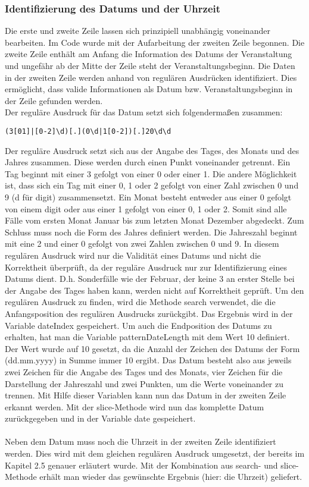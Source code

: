 {\subsubsection{Identifizierung des Datums und der Uhrzeit}
Die erste und zweite Zeile lassen sich prinzipiell unabhängig voneinander bearbeiten. Im Code wurde mit der Aufarbeitung der zweiten Zeile begonnen. Die zweite Zeile enthält am Anfang die Information des Datums der Veranstaltung und ungefähr ab der Mitte der Zeile steht der Veranstaltungsbeginn. Die Daten in der zweiten Zeile werden anhand von regulären Ausdrücken identifiziert. Dies ermöglicht, dass valide Informationen als Datum bzw. Veranstaltungsbeginn in der Zeile gefunden werden.\\
Der reguläre Ausdruck für das Datum setzt sich folgendermaßen zusammen:
\begin{verbatim}
(3[01]|[0-2]\d)[.](0\d|1[0-2])[.]20\d\d
\end{verbatim}
Der reguläre Ausdruck setzt sich aus der Angabe des Tages, des Monats und des Jahres zusammen. Diese werden durch einen Punkt voneinander getrennt. Ein Tag beginnt mit einer 3 gefolgt von einer 0 oder einer 1. Die andere Möglichkeit ist, dass sich ein Tag mit einer 0, 1 oder 2 gefolgt von einer Zahl zwischen 0 und 9 (d für digit) zusammensetzt. Ein Monat besteht entweder aus einer 0 gefolgt von einem digit oder aus einer 1 gefolgt von einer 0, 1 oder 2. Somit sind alle Fälle vom ersten Monat Januar bis zum letzten Monat Dezember abgedeckt. Zum Schluss muss noch die Form des Jahres definiert werden. Die Jahreszahl beginnt mit eine 2 und einer 0 gefolgt von zwei Zahlen zwischen 0 und 9. 
In diesem regulären Ausdruck wird nur die Validität eines Datums und nicht die Korrektheit überprüft, da der reguläre Ausdruck nur zur Identifizierung eines Datums dient. D.h. Sonderfälle wie der Februar, der keine 3 an erster Stelle bei der Angabe des Tages haben kann, werden nicht auf Korrektheit geprüft.
Um den regulären Ausdruck zu finden, wird die Methode search verwendet, die die Anfangsposition des regulären Ausdrucks zurückgibt. Das Ergebnis wird in der Variable dateIndex gespeichert. Um auch die Endposition des Datums zu erhalten, hat man die Variable patternDateLength mit dem Wert 10 definiert. Der Wert wurde auf 10 gesetzt, da die Anzahl der Zeichen des Datums der Form (dd.mm.yyyy) in Summe immer 10 ergibt. Das Datum besteht also aus jeweils zwei Zeichen für die Angabe des Tages und des Monats, vier Zeichen für die Darstellung der Jahreszahl und zwei Punkten, um die Werte voneinander zu trennen. Mit Hilfe dieser Variablen kann nun das Datum in der zweiten Zeile erkannt werden. Mit der slice-Methode wird nun das komplette Datum zurückgegeben und in der Variable date gespeichert.\\
\\
Neben dem Datum muss noch die Uhrzeit in der zweiten Zeile identifiziert werden. Dies wird mit dem gleichen regulären Ausdruck umgesetzt, der bereits im Kapitel 2.5 genauer erläutert wurde. Mit der Kombination aus search- und slice-Methode erhält man wieder das gewünschte Ergebnis (hier: die Uhrzeit) geliefert. 

}
